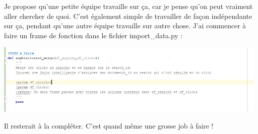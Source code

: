 \documentclass[12pt,french]{article}
\begin{document}
Je propose qu'une petite équipe travaille sur ça, car je pense qu'on peut vraiment aller chercher de quoi. C'est également simple de travailler de façon indépendante sur ça, pendant qu'une autre équipe travaille sur autre chose. J'ai commencer à faire un frame de fonction dans le fichier import\_data.py :

\includegraphics[width=\linewidth]{awesome_merge}

Il resterait à la compléter. C'est quand même une grosse job à faire !
\end{document}
